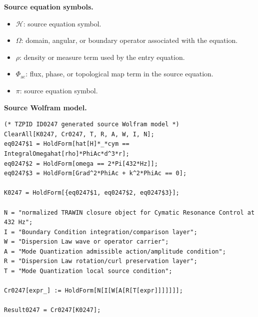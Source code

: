 \begin{minipage}[t]{0.49\linewidth}
\begingroup
\small
\raggedright
\textbf{Source equation symbols.}\par
\begin{itemize}[leftmargin=1.35em,itemsep=1pt,topsep=1pt,parsep=0pt]
    \item $\mathcal{H}$: source equation symbol.
    \item $\Omega$: domain, angular, or boundary operator associated with the equation.
    \item $\rho$: density or measure term used by the entry equation.
    \item $\Phi_{\mathrm{ac}}$: flux, phase, or topological map term in the source equation.
    \item $\pi$: source equation symbol.
\end{itemize}
\endgroup
\end{minipage}\hfill
\begin{minipage}[t]{0.47\linewidth}
\begingroup
\scriptsize
\raggedright
\textbf{Source Wolfram model.}\par
\begin{Verbatim}[fontsize=\tiny,breaklines=true,breakanywhere=true]
(* TZPID ID0247 generated source Wolfram model *)
ClearAll[K0247, Cr0247, T, R, A, W, I, N];
eq0247$1 = HoldForm[hat[H]*_*cym == IntegralOmegahat[rho]*PhiAc*d^3*r];
eq0247$2 = HoldForm[omega == 2*Pi[432*Hz]];
eq0247$3 = HoldForm[Grad^2*PhiAc + k^2*PhiAc == 0];

K0247 = HoldForm[{eq0247$1, eq0247$2, eq0247$3}];

N = "normalized TRAWIN closure object for Cymatic Resonance Control at 432 Hz";
I = "Boundary Condition integration/comparison layer";
W = "Dispersion Law wave or operator carrier";
A = "Mode Quantization admissible action/amplitude condition";
R = "Dispersion Law rotation/curl preservation layer";
T = "Mode Quantization local source condition";

Cr0247[expr_] := HoldForm[N[I[W[A[R[T[expr]]]]]]];

Result0247 = Cr0247[K0247];
\end{Verbatim}
\endgroup
\end{minipage}

